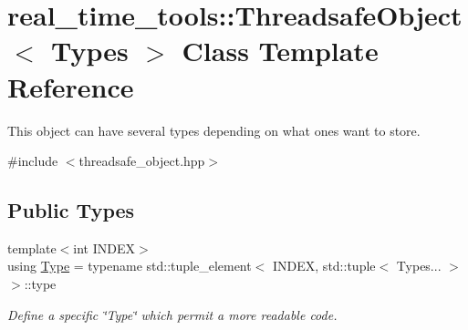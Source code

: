 \hypertarget{classreal__time__tools_1_1ThreadsafeObject}{}\section{real\+\_\+time\+\_\+tools\+:\+:Threadsafe\+Object$<$ Types $>$ Class Template Reference}
\label{classreal__time__tools_1_1ThreadsafeObject}


This object can have several types depending on what ones want to store.  




{\ttfamily \#include $<$threadsafe\+\_\+object.\+hpp$>$}

\subsection*{Public Types}
\begin{DoxyCompactItemize}
\item 
{\footnotesize template$<$int I\+N\+D\+EX$>$ }\\using \hyperlink{classreal__time__tools_1_1ThreadsafeObject_afcbd77df1964d4fe606f1e776f1ff9b8}{Type} = typename std\+::tuple\+\_\+element$<$ I\+N\+D\+EX, std\+::tuple$<$ Types... $>$ $>$\+::type
\begin{DoxyCompactList}\small\item\em Define a specific \char`\"{}\+Type\char`\"{} which permit a more readable code. \end{DoxyCompactList}\end{DoxyCompactItemize}
